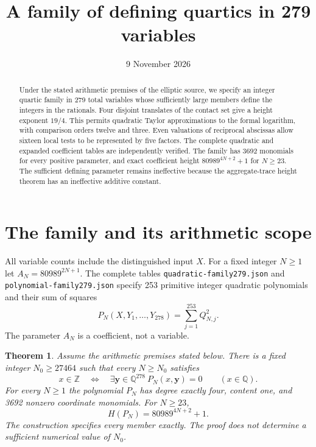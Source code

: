 \documentclass[11pt,a4paper]{article}
\title{A family of defining quartics in 279 variables}
\author{}\date{9 November 2026}
\newtheorem{theorem}{Theorem}[section]\newtheorem{lemma}[theorem]{Lemma}
\newcommand{\Q}{\mathbb Q}\newcommand{\Z}{\mathbb Z}\newcommand{\HH}{\mathcal H}
\begin{document}
\maketitle
\begin{abstract}
Under the stated arithmetic premises of the elliptic source, we specify
an integer quartic family in 279 total variables whose sufficiently
large members define the integers in the rationals. Four disjoint
translates of the contact set give a height exponent $19/4$. This permits
quadratic Taylor approximations to the formal logarithm, with comparison
orders twelve and three. Even valuations of reciprocal abscissas allow
sixteen local tests to be represented by five factors. The complete
quadratic and expanded coefficient tables are independently verified.
The family has 3692 monomials for every positive parameter, and exact
coefficient height $80989^{4N+2}+1$ for $N\ge23$. The sufficient defining
parameter remains ineffective because the aggregate-trace height theorem
has an ineffective additive constant.
\end{abstract}

\section{The family and its arithmetic scope}
All variable counts include the distinguished input $X$. For a fixed
integer $N\ge1$ let $A_N=80989^{2N+1}$. The complete tables
\nolinkurl{quadratic-family279.json} and
\nolinkurl{polynomial-family279.json} specify 253 primitive integer
quadratic polynomials and their sum of squares
\[
 P_N(X,Y_1,\ldots,Y_{278})=\sum_{j=1}^{253}Q_{N,j}^2.
\]
The parameter $A_N$ is a coefficient, not a variable.

\begin{theorem}\label{thm:main}
Assume the arithmetic premises stated below. There is a fixed integer
$N_0\ge27464$ such that every $N\ge N_0$ satisfies
\[
 x\in\Z\quad\Longleftrightarrow\quad
 \exists\mathbf y\in\Q^{278}\ P_N(x,\mathbf y)=0
 \qquad(x\in\Q).
\]
For every $N\ge1$ the polynomial $P_N$ has degree exactly four,
content one, and 3692 nonzero coordinate monomials. For $N\ge23$,
\[
                       H(P_N)=80989^{4N+2}+1.
\]
The construction specifies every member exactly. The proof does not
determine a sufficient numerical value of $N_0$.
\end{theorem}
\end{document}
